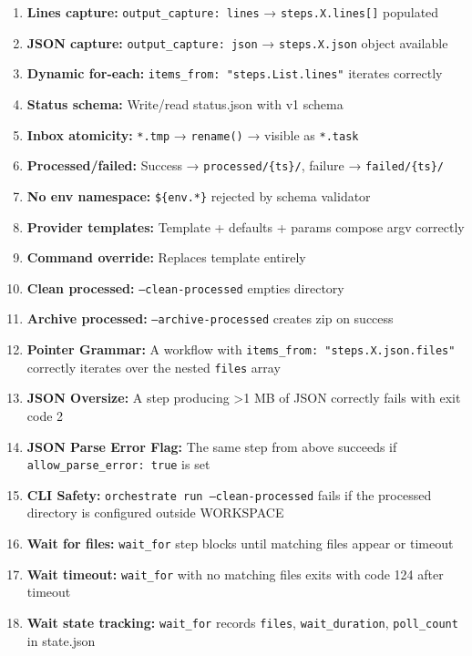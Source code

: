 \documentclass[11pt,a4paper]{article}
\begin{document}
\begin{enumerate}
    \item \textbf{Lines capture:} \texttt{output\_capture: lines} → \texttt{steps.X.lines[]} populated
    \item \textbf{JSON capture:} \texttt{output\_capture: json} → \texttt{steps.X.json} object available
    \item \textbf{Dynamic for-each:} \texttt{items\_from: "steps.List.lines"} iterates correctly
    \item \textbf{Status schema:} Write/read status.json with v1 schema
    \item \textbf{Inbox atomicity:} \texttt{*.tmp} → \texttt{rename()} → visible as \texttt{*.task}
    \item \textbf{Processed/failed:} Success → \texttt{processed/\{ts\}/}, failure → \texttt{failed/\{ts\}/}
    \item \textbf{No env namespace:} \texttt{\$\{env.*\}} rejected by schema validator
    \item \textbf{Provider templates:} Template + defaults + params compose argv correctly
    \item \textbf{Command override:} Replaces template entirely
    \item \textbf{Clean processed:} \texttt{--clean-processed} empties directory
    \item \textbf{Archive processed:} \texttt{--archive-processed} creates zip on success
    \item \textbf{Pointer Grammar:} A workflow with \texttt{items\_from: "steps.X.json.files"} correctly iterates over the nested \texttt{files} array
    \item \textbf{JSON Oversize:} A step producing >1 MB of JSON correctly fails with exit code 2
    \item \textbf{JSON Parse Error Flag:} The same step from above succeeds if \texttt{allow\_parse\_error: true} is set
    \item \textbf{CLI Safety:} \texttt{orchestrate run --clean-processed} fails if the processed directory is configured outside WORKSPACE
    \item \textbf{Wait for files:} \texttt{wait\_for} step blocks until matching files appear or timeout
    \item \textbf{Wait timeout:} \texttt{wait\_for} with no matching files exits with code 124 after timeout
    \item \textbf{Wait state tracking:} \texttt{wait\_for} records \texttt{files}, \texttt{wait\_duration}, \texttt{poll\_count} in state.json
\end{enumerate}
\end{document}

